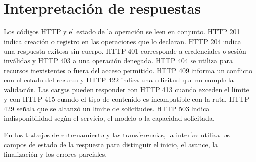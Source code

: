 \section{Interpretación de respuestas}

Los códigos HTTP y el estado de la operación se leen en conjunto.
HTTP 201 indica creación o registro en las operaciones que lo declaran.
HTTP 204 indica una respuesta exitosa sin cuerpo. HTTP 401 corresponde a
credenciales o sesión inválidas y HTTP 403 a una operación denegada.
HTTP 404 se utiliza para recursos inexistentes o fuera del acceso
permitido. HTTP 409 informa un conflicto con el estado del recurso y
HTTP 422 indica una solicitud que no cumple la validación. Las cargas
pueden responder con HTTP 413 cuando exceden el límite y con HTTP 415
cuando el tipo de contenido es incompatible con la ruta. HTTP 429
señala que se alcanzó un límite de solicitudes. HTTP 503 indica
indisponibilidad según el servicio, el modelo o la capacidad solicitada.

En los trabajos de entrenamiento y las transferencias, la interfaz
utiliza los campos de estado de la respuesta para distinguir el inicio,
el avance, la finalización y los errores parciales.

